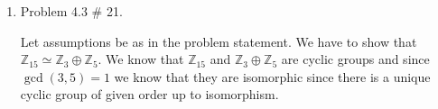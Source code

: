 \documentclass[11pt]{article}
\newcommand{\Z}{\mathbb{Z}}
\begin{document}
\begin{enumerate}
\pagebreak
\item Problem 4.3 \# 21.

Let assumptions be as in the problem statement. We have to show that $\Z_{15}\simeq \Z_3\oplus\Z_5$. We know that $\Z_15$ and $\Z_3\oplus\Z_5$ are cyclic groups and since $\gcd(3,5)=1$ we know that they are isomorphic since there is a unique cyclic group of given order up to isomorphism. 

\end{enumerate}
\end{document}
